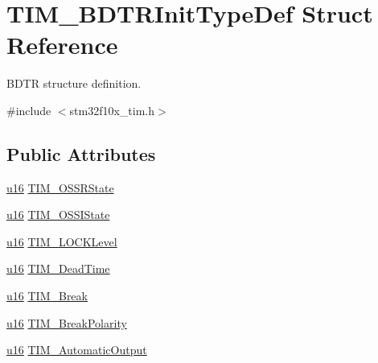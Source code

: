 \hypertarget{struct_t_i_m___b_d_t_r_init_type_def}{}\section{T\+I\+M\+\_\+\+B\+D\+T\+R\+Init\+Type\+Def Struct Reference}
\label{struct_t_i_m___b_d_t_r_init_type_def}


B\+D\+TR structure definition.  




{\ttfamily \#include $<$stm32f10x\+\_\+tim.\+h$>$}

\subsection*{Public Attributes}
\begin{DoxyCompactItemize}
\item 
\hyperlink{agilefox_2library_2inc_2stm32f10x__type_8h_a9e6c91d77e24643b888dbd1a1a590054}{u16} \hyperlink{struct_t_i_m___b_d_t_r_init_type_def_abc0f14fe18b7b49bb85780cb23a52bb8}{T\+I\+M\+\_\+\+O\+S\+S\+R\+State}
\item 
\hyperlink{agilefox_2library_2inc_2stm32f10x__type_8h_a9e6c91d77e24643b888dbd1a1a590054}{u16} \hyperlink{struct_t_i_m___b_d_t_r_init_type_def_a649d0314640b8813a123a609421828c9}{T\+I\+M\+\_\+\+O\+S\+S\+I\+State}
\item 
\hyperlink{agilefox_2library_2inc_2stm32f10x__type_8h_a9e6c91d77e24643b888dbd1a1a590054}{u16} \hyperlink{struct_t_i_m___b_d_t_r_init_type_def_a8220160e0239f661cf63a91ae9c545aa}{T\+I\+M\+\_\+\+L\+O\+C\+K\+Level}
\item 
\hyperlink{agilefox_2library_2inc_2stm32f10x__type_8h_a9e6c91d77e24643b888dbd1a1a590054}{u16} \hyperlink{struct_t_i_m___b_d_t_r_init_type_def_acd52c40b41fe01d7558e1bf57e99887b}{T\+I\+M\+\_\+\+Dead\+Time}
\item 
\hyperlink{agilefox_2library_2inc_2stm32f10x__type_8h_a9e6c91d77e24643b888dbd1a1a590054}{u16} \hyperlink{struct_t_i_m___b_d_t_r_init_type_def_a91400514eba116626f8e8b4d0aee9044}{T\+I\+M\+\_\+\+Break}
\item 
\hyperlink{agilefox_2library_2inc_2stm32f10x__type_8h_a9e6c91d77e24643b888dbd1a1a590054}{u16} \hyperlink{struct_t_i_m___b_d_t_r_init_type_def_a686eee58b4543f0a5788df44556b6c8e}{T\+I\+M\+\_\+\+Break\+Polarity}
\item 
\hyperlink{agilefox_2library_2inc_2stm32f10x__type_8h_a9e6c91d77e24643b888dbd1a1a590054}{u16} \hyperlink{struct_t_i_m___b_d_t_r_init_type_def_a5345b79c70196b6287e66e0c8ff516ba}{T\+I\+M\+\_\+\+Automatic\+Output}

\end{DoxyCompactItemize}
